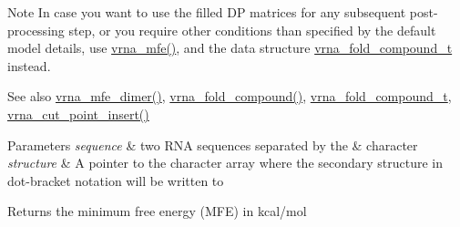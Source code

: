 \begin{DoxyNote}{Note}
In case you want to use the filled DP matrices for any subsequent post-\/processing step, or you require other conditions than specified by the default model details, use \mbox{\hyperlink{group__mfe__global_gabd3b147371ccf25c577f88bbbaf159fd}{vrna\+\_\+mfe()}}, and the data structure \mbox{\hyperlink{group__fold__compound_ga1b0cef17fd40466cef5968eaeeff6166}{vrna\+\_\+fold\+\_\+compound\+\_\+t}} instead.
\end{DoxyNote}
\begin{DoxySeeAlso}{See also}
\mbox{\hyperlink{group__mfe__global_gaab22d10c1190f205f16a77cab9d5d3ee}{vrna\+\_\+mfe\+\_\+dimer()}}, \mbox{\hyperlink{group__fold__compound_ga6601d994ba32b11511b36f68b08403be}{vrna\+\_\+fold\+\_\+compound()}}, \mbox{\hyperlink{group__fold__compound_ga1b0cef17fd40466cef5968eaeeff6166}{vrna\+\_\+fold\+\_\+compound\+\_\+t}}, \mbox{\hyperlink{group__string__utils_ga74f05ece32ea73b59f84a7452afd5fae}{vrna\+\_\+cut\+\_\+point\+\_\+insert()}}
\end{DoxySeeAlso}

\begin{DoxyParams}{Parameters}
{\em sequence} & two R\+NA sequences separated by the \textquotesingle{}\&\textquotesingle{} character \\
\hline
{\em structure} & A pointer to the character array where the secondary structure in dot-\/bracket notation will be written to \\
\hline
\end{DoxyParams}
\begin{DoxyReturn}{Returns}
the minimum free energy (M\+FE) in kcal/mol 
\end{DoxyReturn}
